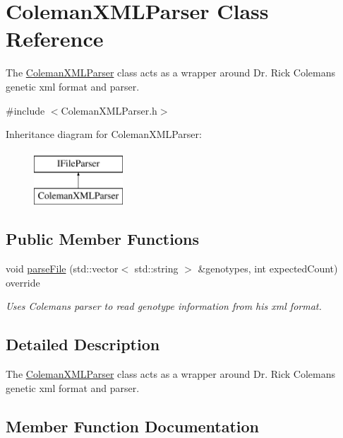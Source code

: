 \hypertarget{class_coleman_x_m_l_parser}{}\section{Coleman\+X\+M\+L\+Parser Class Reference}
\label{class_coleman_x_m_l_parser}


The \hyperlink{class_coleman_x_m_l_parser}{Coleman\+X\+M\+L\+Parser} class acts as a wrapper around Dr. Rick Coleman\textquotesingle{}s genetic xml format and parser.  




{\ttfamily \#include $<$Coleman\+X\+M\+L\+Parser.\+h$>$}

Inheritance diagram for Coleman\+X\+M\+L\+Parser\+:\begin{figure}[H]
\begin{center}
\leavevmode
\includegraphics[height=2.000000cm]{class_coleman_x_m_l_parser}
\end{center}
\end{figure}
\subsection*{Public Member Functions}
\begin{DoxyCompactItemize}
\item 
void \hyperlink{class_coleman_x_m_l_parser_a7b485ea135c4219aacbecfaf637634e4}{parse\+File} (std\+::vector$<$ std\+::string $>$ \&genotypes, int expected\+Count) override
\begin{DoxyCompactList}\small\item\em Uses Coleman\textquotesingle{}s parser to read genotype information from his xml format. \end{DoxyCompactList}\end{DoxyCompactItemize}


\subsection{Detailed Description}
The \hyperlink{class_coleman_x_m_l_parser}{Coleman\+X\+M\+L\+Parser} class acts as a wrapper around Dr. Rick Coleman\textquotesingle{}s genetic xml format and parser. 

\subsection{Member Function Documentation}
